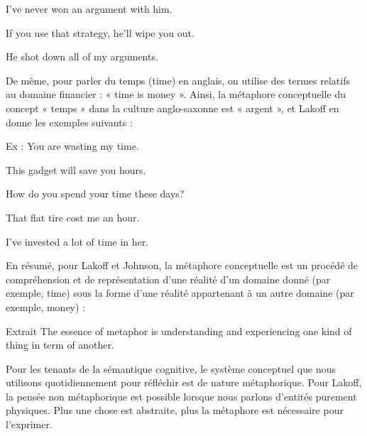 I’ve never won an argument with him.\par


If you use that strategy, he’ll wipe you out.\par

He shot down all of my arguments.\par

De même, pour parler du temps (time) en anglais, on utilise des termes relatifs au domaine financier : « time is money ». Ainsi, la métaphore conceptuelle du concept « temps » dans la culture anglo-saxonne est « argent », et Lakoff en donne les exemples suivants :\par

Ex : You are wasting my time.\par

This gadget will save you hours.\par

How do you spend your time these days?\par

That flat tire cost me an hour.\par

I’ve invested a lot of time in her.\par

En résumé, pour Lakoff et Johnson, la métaphore conceptuelle est un procédé de compréhension et de représentation d’une réalité d’un domaine donné (par exemple, time) sous la forme d’une réalité appartenant à un autre domaine (par exemple, money) :\par


\begin{lecture}{Extrait}
The essence of metaphor is understanding and experiencing one kind of thing in term of another.
\end{lecture}
 Pour les tenants de la sémantique cognitive, le système conceptuel que nous utilisons quotidiennement pour réfléchir est de nature métaphorique. Pour Lakoff, la pensée non métaphorique est possible lorsque nous parlons d’entités purement physiques. Plus une chose est abstraite, plus la métaphore est nécessaire pour l’exprimer.\par

